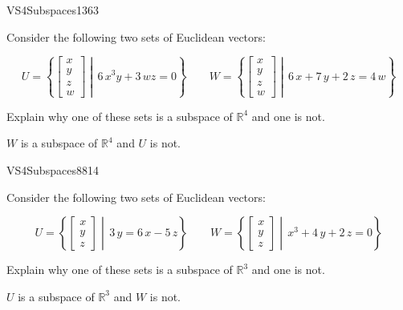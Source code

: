 \begin{exercise}{VS4}{Subspaces}{1363} 
\begin{exerciseStatement} 

Consider the following two sets of Euclidean vectors: 

 \[
          U=\left\{ \left[\begin{array}{c}
x \\
y \\
z \\
w
\end{array}\right] \middle|\,6 \, x^{3} y + 3 \, w z = 0\right\} \hspace{2em}  W=\left\{ \left[\begin{array}{c}
x \\
y \\
z \\
w
\end{array}\right] \middle|\,6 \, x + 7 \, y + 2 \, z = 4 \, w\right\}
    \] 

 Explain why one of these sets is a subspace of \(\mathbb{R}^4\) and one is not. 

 \end{exerciseStatement}
 \begin{exerciseAnswer} 

\(W\) is a subspace of \(\mathbb{R}^4\) and \(U\) is not.

 \end{exerciseAnswer}
 \end{exercise}


\begin{exercise}{VS4}{Subspaces}{8814} 
\begin{exerciseStatement} 

Consider the following two sets of Euclidean vectors: 

 \[
          U=\left\{ \left[\begin{array}{c}
x \\
y \\
z
\end{array}\right] \middle|\,3 \, y = 6 \, x - 5 \, z\right\} \hspace{2em}  W=\left\{ \left[\begin{array}{c}
x \\
y \\
z
\end{array}\right] \middle|\,x^{3} + 4 \, y + 2 \, z = 0\right\}
    \] 

 Explain why one of these sets is a subspace of \(\mathbb{R}^3\) and one is not. 

 \end{exerciseStatement}
 \begin{exerciseAnswer} 

\(U\) is a subspace of \(\mathbb{R}^3\) and \(W\) is not.

 \end{exerciseAnswer}
 \end{exercise}


